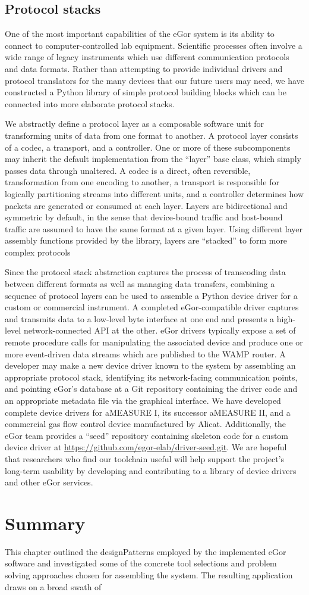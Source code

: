 \documentclass[../thesis]{subfiles}
\begin{document}
\subsection{Protocol stacks} \label{sec:DeviceDrivers}
One of the most important capabilities of the eGor system is its
ability to connect to computer-controlled lab equipment. Scientific
processes often involve a wide range of legacy instruments which use
different communication protocols and data formats. Rather than
attempting to provide individual drivers and protocol translators for
the many devices that our future users may need, we have constructed a
Python library of simple protocol building blocks which can be
connected into more elaborate protocol stacks.

We abstractly define a protocol layer as a composable software unit
for transforming units of data from one format to another. A protocol
layer consists of a codec, a transport, and a controller. One or more
of these subcomponents may inherit the default implementation from the
``layer'' base class, which simply passes data through unaltered. A
codec is a direct, often reversible, transformation from one encoding
to another, a transport is responsible for logically partitioning
streams into different units, and a controller determines how packets
are generated or consumed at each layer. Layers are bidirectional and
symmetric by default, in the sense that device-bound traffic and
host-bound traffic are assumed to have the same format at a given
layer.  Using different layer assembly functions provided by the
library, layers are ``stacked'' to form more complex protocols

Since the protocol stack abstraction captures the process of
transcoding data between different formats as well as managing
data transfers, combining a sequence of protocol layers can be used to
assemble a Python device driver for a custom or commercial
instrument. A completed eGor-compatible driver captures and transmits data to a
low-level byte interface at one end and presents a high-level
network-connected \gls{API} at the other. eGor drivers typically expose a
set of remote procedure calls for manipulating the associated device
and produce one or more event-driven data streams which are published
to the \gls{WAMP} router. A developer may make a new device driver
known to the system by assembling an appropriate protocol stack,
identifying its network-facing communication points, and pointing
eGor's database at a Git repository containing the driver code and an
appropriate metadata file via the graphical interface. We have
developed complete device drivers for aMEASURE I, its successor
aMEASURE II, and a commercial gas flow control device manufactured by
Alicat. Additionally, the eGor team provides a ``seed'' repository
containing skeleton code for a custom device driver at
\url{https://github.com/egor-elab/driver-seed.git}. We are hopeful
that researchers who find our toolchain useful will help support the
project's long-term usability by developing and contributing to a
library of device drivers and other eGor services.

\section{Summary}
This chapter outlined the \glspl{designPattern} employed by the
implemented eGor software and investigated some of the concrete
tool selections and problem solving approaches chosen for assembling
the system. The resulting application draws on a broad swath of
\end{document}
